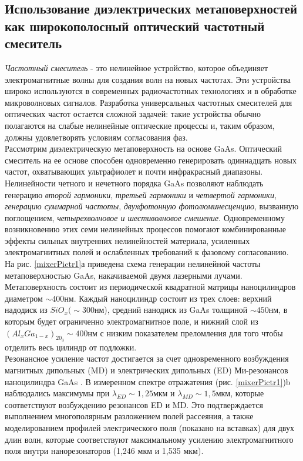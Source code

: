\subsection*{Использование диэлектрических метаповерхностей как широкополосный оптический частотный смеситель}
\textit{Частотный смеситель} - это нелинейное устройство, которое объединяет электромагнитные волны для создания волн на новых частотах. Эти устройства широко используются в  современных радиочастотных технологиях и в обработке микроволновых сигналов. Разработка универсальных частотных смесителей для оптических частот остается сложной задачей: такие устройства обычно полагаются на слабые нелинейные оптические процессы и, таким образом, должны удовлетворять условиям согласования фаз.
\\
\hspace*{2mm}
Рассмотрим диэлектрическую метаповерхность на основе GaAs. Оптический смеситель на ее основе способен одновременно генерировать одиннадцать новых частот, охватывающих ультрафиолет и почти инфракрасный диапазоны. Нелинейности четного и нечетного порядка GaAs позволяют наблюдать генерацию \textit{второй гармоники}, \textit{третьей гармоники} и \textit{четвертой гармоники}, \textit{генерацию суммарной частоты}, \textit{двухфотонную фотолюминесценцию}, вызванную поглощением,\textit{ четырехволновое и шестиволновое смешение}. Одновременному возникновению этих семи нелинейных процессов помогают комбинированные эффекты сильных внутренних нелинейностей материала, усиленных электромагнитных полей и ослабленных требований к фазовому согласованию.
\\
\hspace*{2mm}
На рис. \ref{mixerPictr1}а приведена схема генерации нелинейной частоты метаповерхностью GaAs, накачиваемой двумя лазерными лучами. Метаповерхность состоит из периодической квадратной матрицы наноцилиндров диаметром $\sim 400$нм. Каждый наноцилиндр состоит из трех слоев: верхний надодиск из $SiO_x (\sim 300 $нм), средний нанодиск из GaAs толщиной $\sim 450$нм, в которым будет ограниченно электромагнитное поле, и нижний слой из $(Al_xGa_{1 - x})_20_3 \sim 400$нм с низким показателем преломления  для того чтобы отделить весь цилиндр от подложки.
\\
\hspace*{2mm}
Резонансное усиление частот достигается за счет одновременного  возбуждения магнитных дипольных (MD) и электрических дипольных (ED) Ми-резонансов наноцилиндра GaAs \cite{liu2016iii}. В измеренном спектре отражатения (рис. \ref{mixerPictr1})b наблюдались максимумы при $\lambda_{ED} \sim 1,25$мкм и $\lambda_{MD} \sim 1,5$мкм, которые соответствуют возбуждению резонансов ED и MD. Это  подтверждается выполнением многополярным разложением полей рассеяния, а также моделированием профилей электрического поля (показано на вставках) для двух длин волн, которые соответствуют максимальному усилению электромагнитного поля внутри нанорезонаторов (1,246 мкм и 1,535 мкм).

